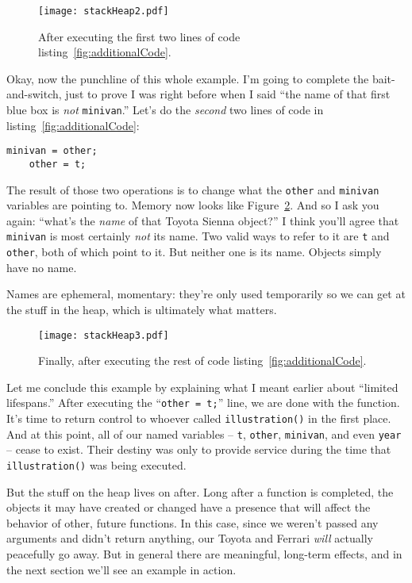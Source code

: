 \begin{figure}[ht]
\centering
\texttt{[image: stackHeap2.pdf]}   %
\caption{After executing the first two lines of code
listing~\ref{fig:additionalCode}.}
\label{fig:stackHeap2}
\end{figure}


Okay, now the punchline of this whole example. I'm going to complete the
bait-and-switch, just to prove I was right before when I said ``the name of
that first blue box is \textit{not} \texttt{minivan}.'' Let's do the
\textit{second} two lines of code in listing~\ref{fig:additionalCode}:

\begin{Verbatim}[fontsize=\small,samepage=true]
    minivan = other;
    other = t;
\end{Verbatim}

The result of those two operations is to change what the \texttt{other} and
\texttt{minivan} variables are pointing to. Memory now looks like
Figure~\ref{fig:stackHeap3}. And so I ask you again: ``what's the
\textit{name} of that Toyota Sienna object?'' I think you'll agree that
\texttt{minivan} is most certainly \textit{not} its name. Two valid ways to
refer to it are \texttt{t} and \texttt{other}, both of which point to it. But
neither one is its name. Objects simply have no name.

Names are ephemeral, momentary: they're only used temporarily so we can get at
the stuff in the heap, which is ultimately what matters.

\begin{figure}[ht]
\centering
\texttt{[image: stackHeap3.pdf]}   %
\caption{Finally, after executing the rest of code
listing~\ref{fig:additionalCode}.}
\label{fig:stackHeap3}
\end{figure}

Let me conclude this example by explaining what I meant earlier about
``limited lifespans.'' After executing the ``\texttt{other = t;}'' line, we are
done with the function. It's time to return control to whoever called
\texttt{illustration()} in the first place. And at this point, all of our
named variables -- \texttt{t}, \texttt{other}, \texttt{minivan}, and even
\texttt{year} -- cease to exist. Their destiny was only to provide service
during the time that \texttt{illustration()} was being executed. 

But the stuff on the heap lives on after. Long after a function is completed,
the objects it may have created or changed have a presence that will affect
the behavior of other, future functions. In this case, since we weren't passed
any arguments and didn't return anything, our Toyota and Ferrari \textit{will}
actually peacefully go away. But in general there are meaningful, long-term
effects, and in the next section we'll see an example in action.

